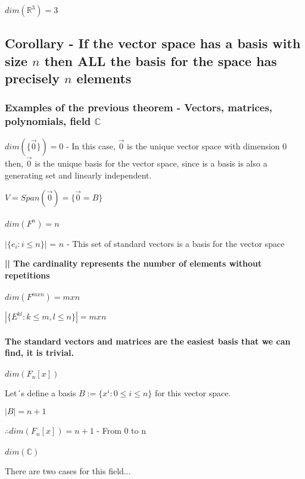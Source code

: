 \documentclass{article}
\begin{document}
\(dim(\mathbb{R}^3) = 3\)

\subsection*{Corollary - If the vector space has a basis with size \(n\) then ALL the basis for the space has precisely \(n\) elements}

\subsubsection*{Examples of the previous theorem - Vectors, matrices, polynomials, field \(\mathbb{C}\)}
\(dim(\{\vec{0}\}) = 0\) - In this case, \(\vec{0}\) is the unique vector space with dimension 0 then, \(\vec{0}\) is the unique basis for the vector space, since is a basis is also a generating set and linearly independent.

\(V = Span(\vec{0}) = \{\vec{0} = B\}\)
\\
\\
\(dim(F^n) = n\)

\(|\{ e_i : i \leq n \}|\) = \(n\) - This set of standard vectors is a basis for the vector space 

\textbf{|| The cardinality represents the number of elements without repetitions}
\\
\\
\(dim(F^{mxn}) = mxn\)

\(|\{ E^{kl} : k \leq m, l \leq n\}| = mxn\)
\\
\\
\textbf{The standard vectors and matrices are the easiest basis that we can find, it is trivial.}
\\
\\
\(dim(F_n[x])\)

Let´s define a basis \(B := \{ x^i : 0 \leq i \leq n \}\) for this vector space.

\(|B| = n+1\)

\(\therefore dim(F_n[x]) = n+1\) - From 0 to n 
\\
\\
\(dim(\mathbb{C})\)

There are two cases for this field...
\end{document}
